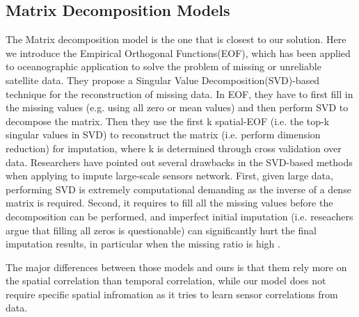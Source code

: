 \subsection{Matrix Decomposition Models}
The Matrix decomposition model is the one that is closest to our solution. Here we introduce the Empirical Orthogonal Functions(EOF), which has been applied to oceanographic application to solve the problem of missing or unreliable satellite data\cite{beckers2003eof}. 
They propose a Singular Value Decomposition(SVD)-based technique for the reconstruction of missing data. In EOF, they have to first fill in the missing values (e.g. using all zero or mean values) and then perform SVD to decompose the matrix. Then they use the first k spatial-EOF (i.e. the top-k singular values in SVD) to reconstruct the matrix (i.e. perform dimension reduction) for imputation, where k is determined through cross validation over data.
Researchers have pointed out several drawbacks in the SVD-based methods when applying to impute large-scale sensors network. First, given large data, performing SVD is extremely computational demanding as the inverse of a dense matrix is required. Second, it requires to fill all the missing values before the decomposition can be performed, and imperfect initial imputation (i.e. reseachers argue that filling all zeros is questionable) can significantly hurt the final imputation results, in particular when the missing ratio is high \cite{koren2009matrix}\cite{ke2005robust}. 

The major differences between those models and ours is that them rely more on the spatial correlation than temporal correlation, while our model does not require specific spatial infromation as it tries to learn sensor correlations from data. 
  
